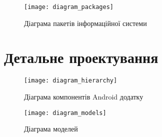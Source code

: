 \documentclass[../main.tex]{subfiles}
\begin{document}

\begin{figure}[H]
	\centering
	\texttt{[image: diagram\_packages]}
	\caption{Діаграма пакетів інформаційної системи}
	\label{diagram:3.1}
\end{figure}

\section{Детальне проектування}

\begin{figure}[H]
	\centering
	\texttt{[image: diagram\_hierarchy]}
	\caption{Діаграма компонентів Android додатку}
\end{figure}

\begin{figure}[H]
	\centering
	\texttt{[image: diagram\_models]}
	\caption{Діаграма моделей}
\end{figure}
\end{document}
